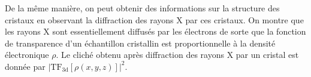De la même manière, on peut obtenir des informations sur la structure des cristaux en observant la diffraction des rayons X par ces cristaux. On montre que les rayons X sont essentiellement diffusés par les électrons de sorte que la fonction de transparence d'un échantillon cristallin est proportionnelle à la densité électronique \(\rho\). Le cliché obtenu après  diffraction des rayons X par un cristal est donnée par \(|\mathrm{TF_{3d}}[\rho(x,y,z)]|^2\).



